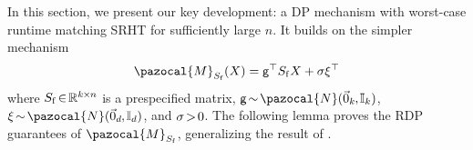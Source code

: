 \documentclass[11pt]{article}
\theoremstyle{definition}
\theoremstyle{plain}
\newcommand{\reals}{\mathbb{R}}
\providecommand{\brI}{\mathbb{I}}
\newcommand{\Norm}[1]{\left\| #1 \right\|}
\providecommand{\norm}[1]{\Norm{#1}}
\newcommand{\pM}{\pazocal{M}}
\newcommand{\pN}{\pazocal{N}}
\begin{document}
In this section, we present our key development: a DP mechanism with worst-case runtime matching SRHT for sufficiently large $n$. It builds on the simpler mechanism
\begin{equation}
    \label{eq:sketch_fast_ailon_modified}
    \pM_{S_{\mathrm{f}}}(X) = \mathsf{g}^{\top}S_{\mathrm{f}}X + \sigma \xi^{\top}
\end{equation}
where \(S_{\mathrm{f}} \hspace{-0.15em}\in\hspace{-0.15em} \reals^{k \hspace{-0.05em}\times\hspace{-0.05em} n}\) is a prespecified matrix, \(\mathsf{g} \hspace{-0.15em}\sim\hspace{-0.15em} \pN(\vec{0}_{k}\hspace{-0.05em},\hspace{-0.05em} \brI_{k})\), \(\xi \hspace{-0.15em}\sim\hspace{-0.15em} \pN(\vec{0}_{d}\hspace{-0.05em},\hspace{-0.05em} \brI_{d})\), and \(\sigma \hspace{-0.15em}>\hspace{-0.15em} 0\). 
The following lemma proves the RDP guarantees of \(\pM_{S_{\mathrm{f}}}\), generalizing the result of \citet[Lemma 1]{lev2025gaussianmix}.
\end{document}
